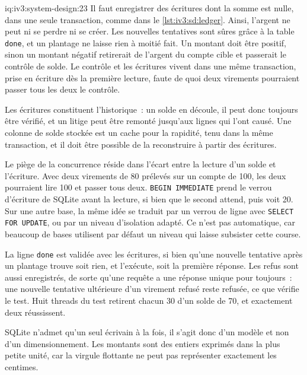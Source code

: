 \begin{solution}{iq:iv3:system-design:23}
Il faut enregistrer des écritures dont la somme est nulle, dans une seule transaction, comme dans le \cref{lst:iv3:sd:ledger}. Ainsi, l'argent ne peut ni se perdre ni se créer. Les nouvelles tentatives sont sûres grâce à la table \texttt{done}, et un plantage ne laisse rien à moitié fait. Un montant doit être positif, sinon un montant négatif retirerait de l'argent du compte cible et passerait le contrôle de solde. Le contrôle et les écritures vivent dans une même transaction, prise en écriture dès la première lecture, faute de quoi deux virements pourraient passer tous les deux le contrôle.
\label{lst:iv3:sd:ledger}

Les écritures constituent l'historique~: un solde en découle, il peut donc toujours être vérifié, et un litige peut être remonté jusqu'aux lignes qui l'ont causé. Une colonne de solde stockée est un cache pour la rapidité, tenu dans la même transaction, et il doit être possible de la reconstruire à partir des écritures.

Le piège de la concurrence réside dans l'écart entre la lecture d'un solde et l'écriture. Avec deux virements de 80 prélevés sur un compte de 100, les deux pourraient lire 100 et passer tous deux. \texttt{BEGIN IMMEDIATE} prend le verrou d'écriture de SQLite avant la lecture, si bien que le second attend, puis voit 20. Sur une autre base, la même idée se traduit par un verrou de ligne avec \texttt{SELECT FOR UPDATE}, ou par un niveau d'isolation adapté. Ce n'est pas automatique, car beaucoup de bases utilisent par défaut un niveau qui laisse subsister cette course.

La ligne \texttt{done} est validée avec les écritures, si bien qu'une nouvelle tentative après un plantage trouve soit rien, et l'exécute, soit la première réponse. Les refus sont aussi enregistrés, de sorte qu'une requête a une réponse unique pour toujours~: une nouvelle tentative ultérieure d'un virement refusé reste refusée, ce que vérifie le test. Huit threads du test retirent chacun 30 d'un solde de 70, et exactement deux réussissent.

SQLite n'admet qu'un seul écrivain à la fois, il s'agit donc d'un modèle et non d'un dimensionnement. Les montants sont des entiers exprimés dans la plus petite unité, car la virgule flottante ne peut pas représenter exactement les centimes.

\end{solution}

